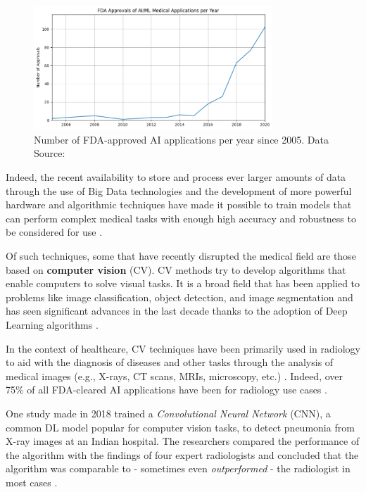 \documentclass[../main.tex]{subfiles}
\begin{document}
    \begin{figure}[h]
        \centering
        \includegraphics[width=0.8\textwidth]{fda_approved_ml_apps}
        \caption{Number of FDA-approved AI applications per year since 2005. Data Source: \cite{health_artificial_2022}}
        \label{fig:fda_approved_ml_apps}
    \end{figure}
    
    Indeed, the recent availability to store and process ever larger amounts of data through the use of Big Data technologies and the development of more powerful hardware and algorithmic techniques have made it possible to train models that can perform complex medical tasks with enough high accuracy and robustness to be considered for use
    \cite{topol_high-performance_2019}.

    Of such techniques, some that have recently disrupted the medical field are those based on \textbf{computer vision}  (CV). CV methods try to develop algorithms that enable computers to solve visual tasks. It is a broad field that has been applied to problems like image classification, object detection, and image segmentation and has seen significant advances in the last decade thanks to the adoption of Deep Learning algorithms \cite{lecun_deep_2015}.

    In the context of healthcare, CV techniques have been primarily used in radiology to aid with the diagnosis of diseases and other tasks through the analysis of medical images (e.g., X-rays, CT scans, MRIs, microscopy, etc.) \cite{esteva_deep_2021}. Indeed, over 75\% of all FDA-cleared AI applications have been for radiology use cases \cite{health_artificial_2022}.
    
    One study made in 2018 trained a \textit{Convolutional Neural Network} (CNN), a common DL model popular for computer vision tasks, to detect pneumonia from X-ray images at an Indian hospital. The researchers compared the performance of the algorithm with the findings of four expert radiologists and concluded that the algorithm was comparable to - sometimes even \textit{outperformed} - the radiologist in most cases \cite{wang_chestx-ray8_2017}.
\end{document}
